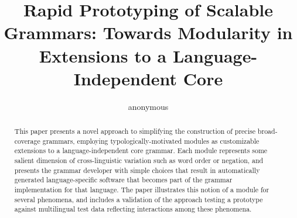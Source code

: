 %

\newcommand{\hpsg}{\textsc{hpsg}}
\newcommand{\lkb}{\textsc{lkb}}
\newcommand{\lfg}{\textsc{lfg}}





\title{Rapid Prototyping of Scalable Grammars: Towards Modularity in Extensions to a Language-Independent Core}

\author{anonymous}


\maketitle

\begin{abstract}
This paper presents a novel approach to simplifying the construction
of precise broad-coverage grammars, employing typologically-motivated
modules as customizable extensions to a language-independent core
grammar.  Each module represents some salient dimension of
cross-linguistic variation such as word order or negation, and
presents the grammar developer with simple choices that result in
automatically generated language-specific software that becomes part
of the grammar implementation for that language.  The paper
illustrates this notion of a module for several phenomena, and
includes a validation of the approach testing a prototype against
multilingual test data reflecting interactions among these phenomena.
\end{abstract}
%

